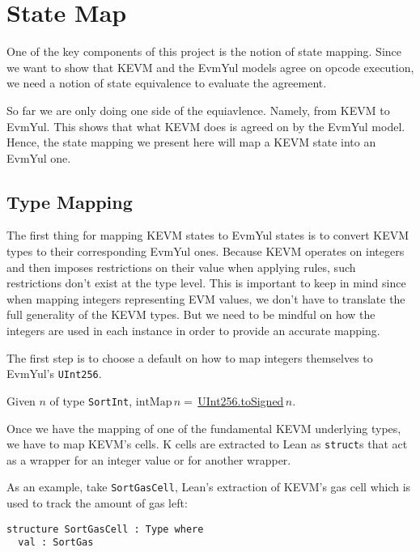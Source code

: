 \chapter{State Map}\label{chap:statemap}

One of the key components of this project is the notion of state mapping. Since
we want to show that KEVM and the EvmYul models agree on opcode execution, we
need a notion of state equivalence to evaluate the agreement.

So far we are only doing one side of the equiavlence. Namely, from KEVM to
EvmYul. This shows that what KEVM does is agreed on by the EvmYul model. Hence,
the state mapping we present here will map a KEVM state into an EvmYul one.

\section{Type Mapping}

The first thing for mapping KEVM states to EvmYul states is to convert KEVM
types to their corresponding EvmYul ones.
Because KEVM operates on integers and then imposes restrictions on their value
when applying rules, such restrictions don't exist at the type level. This is
important to keep in mind since when mapping integers representing EVM values,
we don't have to translate the full generality of the KEVM types. But we need to
be mindful on how the integers are used in each instance in order to provide an
accurate mapping.

The first step is to choose a default on how to map integers themselves to
EvmYul's \texttt{UInt256}.

\begin{definition}[intMap]\leanok\label{def:intMap}
Given $n$ of type \texttt{SortInt},
$\text{intMap}\, n =\,
$\href{https://runtimeverification.github.io/evm-equivalence/docs/EvmYul/UInt256.html#EvmYul.UInt256.toSigned}{UInt256.toSigned}$\,n$.
\end{definition}

Once we have the mapping of one of the fundamental KEVM underlying types, we
have to map KEVM's cells. K cells are extracted to Lean as \texttt{struct}s that
act as a wrapper for an integer value or for another wrapper.

As an example, take \texttt{SortGasCell},  Lean's extraction of KEVM's gas cell
which is used to track the amount of gas left:

\begin{verbatim}
structure SortGasCell : Type where
  val : SortGas
\end{verbatim}

